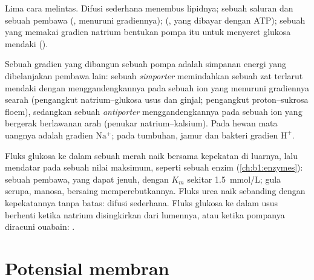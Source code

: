 \begin{omfigure}
{\small Lima cara melintas. Difusi sederhana menembus lipidnya; sebuah
saluran dan sebuah pembawa (, menuruni gradiennya);
 (, yang dibayar dengan
ATP); sebuah  yang memakai gradien natrium bentukan pompa itu
untuk menyeret glukosa mendaki ().}
\end{omfigure}

\begin{proposition}\label{prop:b1:membranes-transport:secondary}
Sebuah gradien yang dibangun sebuah pompa adalah simpanan energi yang
dibelanjakan pembawa lain: sebuah \emph{simporter}
memindahkan sebuah zat terlarut mendaki dengan menggandengkannya pada
sebuah ion yang menuruni gradiennya searah (pengangkut
natrium--glukosa usus dan ginjal; pengangkut proton--sukrosa floem),
sedangkan sebuah \emph{antiporter} menggandengkannya
pada sebuah ion yang bergerak berlawanan arah (penukar
natrium--kalsium). Pada  hewan mata uangnya adalah gradien
$\mathrm{Na^+}$; pada tumbuhan, jamur dan bakteri gradien
$\mathrm{H^+}$.
\end{proposition}

\begin{example}\label{ex:b1:membranes-transport:kinetics}
Fluks glukosa ke dalam sebuah  merah naik bersama kepekatan di
luarnya, lalu mendatar pada sebuah nilai maksimum, seperti sebuah enzim
(\cref{ch:b1:enzymes}): sebuah pembawa, yang dapat jenuh, dengan $K_m$
sekitar \qty{1.5}{mmol/L}; gula serupa, manosa, bersaing memperebutkannya.
Fluks urea naik sebanding dengan kepekatannya tanpa batas: difusi
sederhana. Fluks glukosa ke dalam  usus berhenti ketika natrium
disingkirkan dari lumennya, atau ketika pompanya diracuni ouabain:
.
\end{example}

\section{Potensial membran}

